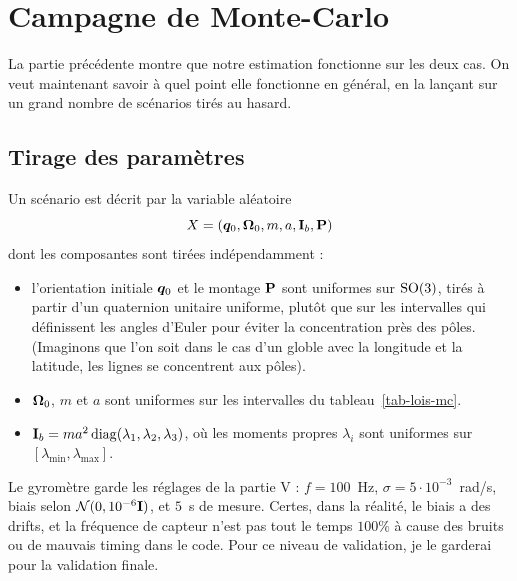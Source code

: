 
\section{Campagne de Monte-Carlo}

La partie précédente montre que notre estimation fonctionne sur les deux cas. On
veut maintenant savoir à quel point elle fonctionne en général, en la
lançant sur un grand nombre de scénarios tirés au hasard.

\subsection{Tirage des paramètres}

Un scénario est décrit par la variable aléatoire
\[
    X = (\bm{q}_0, \bm{\Omega}_0, m, a, \mathbf{I}_b, \mathbf{P})
\]
dont les composantes sont tirées indépendamment :
\begin{itemize}
    \item l'orientation initiale $\bm{q}_0$ et le montage $\mathbf{P}$
    sont uniformes sur $\mathrm{SO}(3)$, tirés à partir d'un quaternion unitaire
    uniforme, plutôt que sur les intervalles qui définissent les angles d'Euler 
    pour éviter la concentration près des pôles. (Imaginons que l'on soit dans le cas d'un globle
    avec la longitude et la latitude, les lignes se concentrent aux pôles).
    \item $\bm{\Omega}_0$, $m$ et $a$ sont uniformes sur les
    intervalles du tableau~\ref{tab-lois-mc}.
    \item $\mathbf{I}_b = ma^2\,\mathrm{diag}(\lambda_1, \lambda_2, \lambda_3)$,
    où les moments propres $\lambda_i$ sont uniformes sur
    $[\lambda_{\min}, \lambda_{\max}]$.
\end{itemize}

Le gyromètre garde les réglages de la partie V : $f = 100$~Hz,
$\sigma = 5\cdot 10^{-3}$~rad/s, biais selon $\mathcal{N}(0, 10^{-6}\mathbf{I})$,
et $5$~s de mesure. Certes, dans la réalité, le biais a des drifts, et la fréquence de capteur n'est pas tout le temps $100\%$ à cause des bruits ou de mauvais timing dans le code. Pour ce niveau de validation, je le garderai pour la validation finale.

